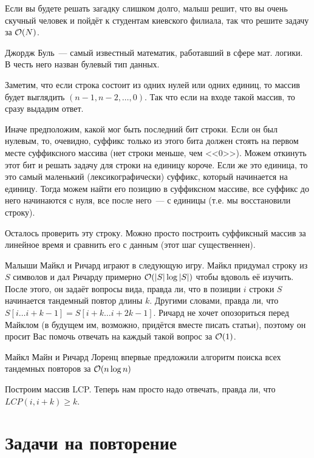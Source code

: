 \documentclass[addpoints]{exam}
\begin{document}
\begin{questions}
Если вы будете решать загадку слишком долго, малыш решит, что вы очень скучный человек и пойдёт к студентам киевского филиала, так что решите задачу за $\mathcal{O}(N)$.

\begin{solution}

Джордж Буль~--- самый известный математик, работавший в сфере мат. логики. В честь него назван булевый тип данных.

Заметим, что если строка состоит из одних нулей или одних единиц, то массив будет выглядить $(n-1, n-2, \ldots, 0)$. Так что если на входе такой массив, то сразу выдадим ответ.

Иначе предположим, какой мог быть последний бит строки. Если он был нулевым, то, очевидно, суффикс только из этого бита должен стоять на первом месте суффиксного массива (нет строки меньше, чем <<0>>). Можем откинуть этот бит и решать задачу для строки на единицу короче. Если же это единица, то это самый маленький (лексикографически) суффикс, который начинается на единицу. Тогда можем найти его позицию в суффиксном массиве, все суффикс до него начинаются с нуля, все после него~--- с единицы (т.е. мы восстановили строку).

Осталось проверить эту строку. Можно просто построить суффиксный массив за линейное время и сравнить его с данным (этот шаг существеннен).

\end{solution}

\question[\half] \label{tandem} Малыши Майкл и Ричард играют в следующую игру. Майкл придумал строку из $S$ символов и дал Ричарду примерно $\mathcal{O}(|S| \log |S|)$ чтобы вдоволь её изучить. После этого, он задаёт вопросы вида, правда ли, что в позиции $i$ строки $S$ начинается тандемный повтор длины $k$. Другими словами, правда ли, что $S[i\ldots i+k-1] = S[i+k \ldots i + 2k - 1]$. Ричард не хочет опозориться перед Майклом (в будущем им, возможно, придётся вместе писать статьи), поэтому он просит Вас помочь отвечать на каждый такой вопрос за $\mathcal{O}(1)$.

\begin{solution}

Майкл Майн и Ричард Лоренц впервые предложили алгоритм поиска всех тандемных повторов за $\mathcal{O}(n \log{n})$

Построим массив LCP. Теперь нам просто надо отвечать, правда ли, что $LCP(i,i+k) \geqslant k$.

\end{solution}

\section{Задачи на повторение}


\end{questions}
\end{document}
